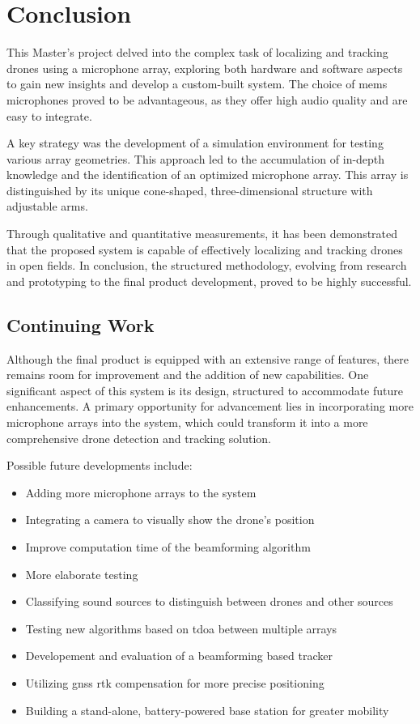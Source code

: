 \chapter{Conclusion}
This Master's project delved into the complex task of localizing and tracking drones using a microphone array,
exploring both hardware and software aspects to gain new insights and develop a custom-built system.
The choice of \acrshort{mems} microphones proved to be advantageous, as they offer high audio quality and are easy to integrate.

A key strategy was the development of a simulation environment for testing various array geometries.
This approach led to the accumulation of in-depth knowledge and the identification of an optimized microphone array.
This array is distinguished by its unique cone-shaped, three-dimensional structure with adjustable arms.

Through qualitative and quantitative measurements, it has been demonstrated that the proposed system is capable of effectively localizing and tracking drones in open fields.
In conclusion, the structured methodology, evolving from research and prototyping to the final product development, proved to be highly successful.

\newpage
\section{Continuing Work}
Although the final product is equipped with an extensive range of features, there remains room for improvement and the addition of new capabilities.
One significant aspect of this system is its design, structured to accommodate future enhancements.
A primary opportunity for advancement lies in incorporating more microphone arrays into the system,
which could transform it into a more comprehensive drone detection and tracking solution.

Possible future developments include:
\begin{itemize}
	\item Adding more microphone arrays to the system
	\item Integrating a camera to visually show the drone's position
	\item Improve computation time of the beamforming algorithm
	\item More elaborate testing
	\item Classifying sound sources to distinguish between drones and other sources
	\item Testing new algorithms based on \acrshort{tdoa} between multiple arrays
	\item Developement and evaluation of a beamforming based tracker
	\item Utilizing \acrshort{gnss} \acrshort{rtk} compensation for more precise positioning
	\item Building a stand-alone, battery-powered base station for greater mobility
\end{itemize}

